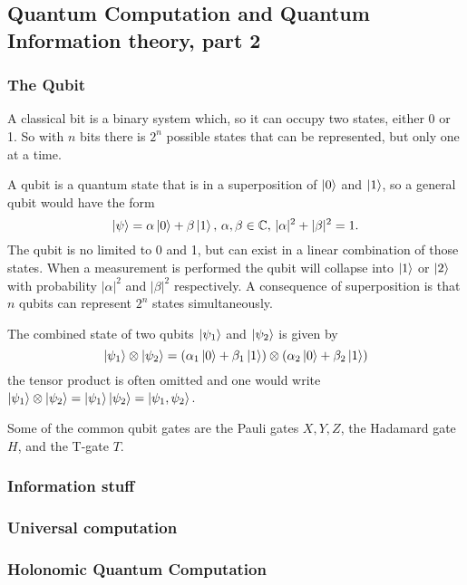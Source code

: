 \subsection{Quantum Computation and Quantum Information theory, part 2}

\subsubsection{The Qubit}
A classical bit is a binary system which, so it can occupy two states, either 0 or 1. So with $n$ bits there is $2^n$ possible states that can be represented, but only one at a time.

A qubit is a quantum state that is in a superposition of $\ket{0}$ and $\ket{1}$, so a general qubit would have the form
\begin{equation}
\label{eq:qubit}
\ket{\psi} = \alpha\ket{0} + \beta\ket{1},\,\alpha,\beta \in \mathbb{C},\, |\alpha|^2 + |\beta|^2 = 1.
\end{equation}
The qubit is no limited to 0 and 1, but can exist in a linear combination of those states. When a measurement is performed the qubit will collapse into $\ket{1}$ or $\ket{2}$ with probability $|\alpha|^2$ and $|\beta|^2$ respectively. A consequence of superposition is that $n$ qubits can represent $2^n$ states simultaneously.

The combined state of two qubits $\ket{\psi_1}$ and $\ket{\psi_2}$ is given by 
\begin{equation}
\ket{\psi_1} \otimes \ket{\psi_2} = (\alpha_1\ket{0} + \beta_1\ket{1})\otimes(\alpha_2\ket{0} + \beta_2\ket{1})
\end{equation}
the tensor product is often omitted and one would write $\ket{\psi_1} \otimes \ket{\psi_2} = \ket{\psi_1}\ket{\psi_2} = \ket{\psi_1, \psi_2}$.

Some of the common qubit gates are the Pauli gates $X,Y,Z$, the Hadamard gate $H$, and the T-gate $T$.





\subsubsection{Information stuff}

\subsubsection{Universal computation}

\subsubsection{Holonomic Quantum Computation}

